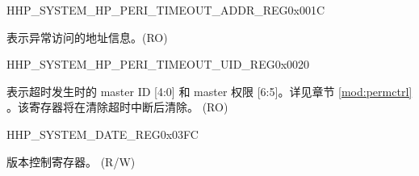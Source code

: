 \begin{register}{H}{HP\_SYSTEM\_HP\_PERI\_TIMEOUT\_ADDR\_REG}{0x001C}\label{regdesc:HPSYSTEMHPPERITIMEOUTADDRREG}
%
\regnewline%
\begin{regdesc}\begin{reglist}
\label{fielddesc:HPSYSTEMHPPERITIMEOUTADDR}\item [HP\_SYSTEM\_HP\_PERI\_TIMEOUT\_ADDR] 表示异常访问的地址信息。(RO)
\end{reglist}\end{regdesc}
\end{register}


\begin{register}{H}{HP\_SYSTEM\_HP\_PERI\_TIMEOUT\_UID\_REG}{0x0020}\label{regdesc:HPSYSTEMHPPERITIMEOUTUIDREG}
%
%
\regnewline%
\begin{regdesc}\begin{reglist}
\label{fielddesc:HPSYSTEMHPPERITIMEOUTUID}\item [HP\_SYSTEM\_HP\_PERI\_TIMEOUT\_UID] 表示超时发生时的 master  ID [4:0] 和 master 权限 [6:5]。详见章节 \ref{mod:permctrl} \textit{}。该寄存器将在清除超时中断后清除。 (RO)
\end{reglist}\end{regdesc}
\end{register}


\begin{register}{H}{HP\_SYSTEM\_DATE\_REG}{0x03FC}\label{regdesc:HPSYSTEMDATEREG}
%
%
\regnewline%
\begin{regdesc}\begin{reglist}
\label{fielddesc:HPSYSTEMDATE}\item [HP\_SYSTEM\_DATE] 版本控制寄存器。 (R/W)
\end{reglist}\end{regdesc}
\end{register}
